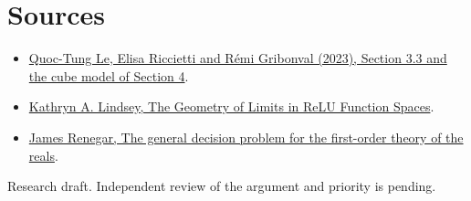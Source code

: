\documentclass[10pt]{article}
\begin{document}
\section*{Sources}
\begin{itemize}
\item \href{https://arxiv.org/abs/2306.02666}{Quoc-Tung Le, Elisa Riccietti and Rémi Gribonval (2023), Section 3.3 and the cube model of Section 4}.
\item \href{https://arxiv.org/abs/2610.33779}{Kathryn A. Lindsey, The Geometry of Limits in ReLU Function Spaces}.
\item \href{https://doi.org/10.1016/S0747-7171(10)80004-5}{James Renegar, The general decision problem for the first-order theory of the reals}.
\end{itemize}
{\small Research draft. Independent review of the argument and priority is pending.}
\end{document}
